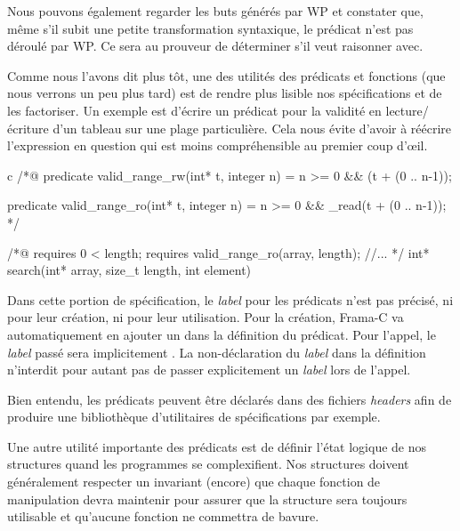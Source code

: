 \documentclass[middle]{zmdocument}
\begin{document}
Nous pouvons également regarder les buts générés par WP et constater que, 
même s'il subit une petite transformation syntaxique, le prédicat n'est pas 
déroulé par WP. Ce sera au prouveur de déterminer s'il veut raisonner avec.



Comme nous l'avons dit plus tôt, une des utilités des prédicats et fonctions (que 
nous verrons un peu plus tard) est de rendre plus lisible nos spécifications et 
de les factoriser. Un exemple est d'écrire un prédicat pour la validité en 
lecture/écriture d'un tableau sur une plage particulière. Cela nous évite d'avoir
à réécrire l'expression en question qui est moins compréhensible au premier 
coup d’œil.



\begin{CodeBlock}{c}
/*@
  predicate valid_range_rw(int* t, integer n) =
    n >= 0 && \valid(t + (0 .. n-1));

  predicate valid_range_ro(int* t, integer n) =
    n >= 0 && \valid_read(t + (0 .. n-1));
*/

/*@
  requires 0 < length;
  requires valid_range_ro(array, length);
  //...
*/
int* search(int* array, size_t length, int element)
\end{CodeBlock}



Dans cette portion de spécification, le \textit{label} pour les prédicats n'est pas 
précisé, ni pour leur création, ni pour leur utilisation. Pour la création, 
Frama-C va automatiquement en ajouter un dans la définition du prédicat. 
Pour l'appel, le \textit{label} passé sera implicitement . La non-déclaration
du \textit{label} dans la définition n'interdit pour autant pas de passer explicitement
un \textit{label} lors de l'appel.



Bien entendu, les prédicats peuvent être déclarés dans des fichiers \textit{headers} afin
de produire une bibliothèque d'utilitaires de spécifications par exemple.





Une autre utilité importante des prédicats est de définir l'état logique de nos
structures quand les programmes se complexifient. Nos structures doivent 
généralement respecter un invariant (encore) que chaque fonction de manipulation
devra maintenir pour assurer que la structure sera toujours utilisable et 
qu'aucune fonction ne commettra de bavure.
\end{document}
